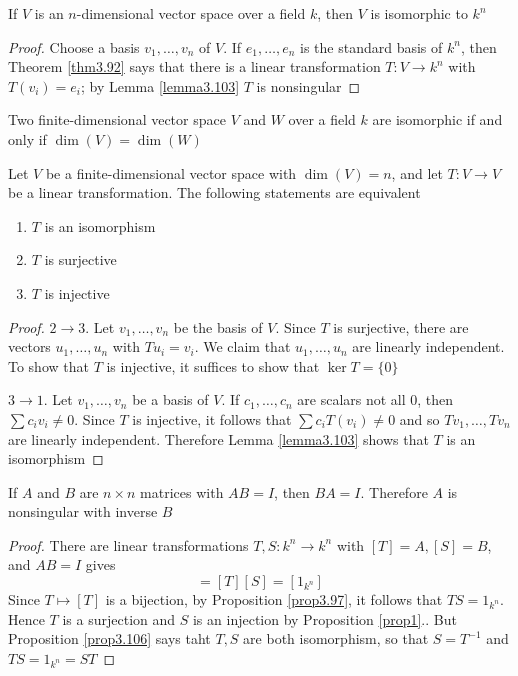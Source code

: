 \documentclass[11pt]{article}
\begin{document}
\begin{theorem}[]
If \(V\) is an \(n\)-dimensional vector space over a field \(k\), then \(V\) is
isomorphic to \(k^n\)
\end{theorem}

\begin{proof}
Choose a basis \(v_1,\dots,v_n\) of \(V\). If \(e_1,\dots,e_n\) is the
standard basis of \(k^n\), then Theorem \ref{thm3.92} says that there is a
linear transformation \(T:V\to k^n\) with \(T(v_i)=e_i\); by Lemma
\ref{lemma3.103} \(T\) is nonsingular
\end{proof}

\begin{corollary}[]
Two finite-dimensional vector space \(V\) and \(W\) over a field \(k\) are
isomorphic if and only if \(\dim(V)=\dim(W)\)
\end{corollary}

\begin{proposition}[]
\label{prop3.106}
Let \(V\) be a finite-dimensional vector space with \(\dim(V)=n\), and let 
\(T:V\to V\) be a linear transformation. The following statements are
equivalent
\begin{enumerate}
\item \(T\) is an isomorphism
\item \(T\) is surjective
\item \(T\) is injective
\end{enumerate}
\end{proposition}

\begin{proof}
\(2\to 3\). Let \(v_1,\dots,v_n\) be the basis of \(V\). Since \(T\) is
surjective, there are vectors \(u_1,\dots,u_n\) with \(Tu_i=v_i\). We claim
that \(u_1,\dots,u_n\) are linearly independent. To show that \(T\) is
injective, it suffices to show that \(\ker T=\{0\}\)

\(3\to 1\). Let \(v_1,\dots,v_n\) be a basis of \(V\). If \(c_1,\dots,c_n\)
are scalars not all 0, then \(\sum c_iv_i\neq0\). Since \(T\) is injective, it
follows that \(\sum c_iT(v_i)\neq0\) and so \(Tv_1,\dots,Tv_n\) are linearly
independent. Therefore Lemma \ref{lemma3.103} shows that \(T\) is an isomorphism
\end{proof}

\begin{corollary}[]
If \(A\) and \(B\) are \(n\times n\) matrices with \(AB=I\), then \(BA=I\).
Therefore \(A\) is nonsingular with inverse \(B\)
\end{corollary}
\begin{proof}
There are linear transformations \(T,S:k^n\to k^n\) with \([T]=A,[S]=B\),
and \(AB=I\) gives
\begin{equation*}
[TS]=[T][S]=[1_{k^n}]
\end{equation*}
Since \(T\mapsto[T]\) is a bijection, by Proposition \ref{prop3.97}, it
follows that \(TS=1_{k^n}\). Hence \(T\) is a surjection and \(S\) is an
injection by Proposition \ref{prop1}.. But Proposition \ref{prop3.106} says taht \(T,S\) are both
isomorphism, so that \(S=T^{-1}\) and \(TS=1_{k^n}=ST\)
\end{proof}
\end{document}
